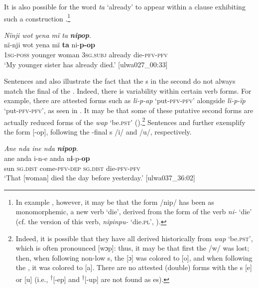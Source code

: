 It is also possible for the word \textit{ta} ‘already’ to appear within a clause exhibiting such a construction .\footnote{In example , however, it may be that the form /nip/ has been  as monomorphemic, a new verb ‘die’, derived from the  form of the verb \textit{ni-} ‘die’ (cf. the  version of this verb, \textit{nipinpu-} ‘die.\textsc{pl}’, ).}

\ea%
    \label{ex:verbs:47}
          \textit{Nïnji wot yena mï ta} \textbf{\textit{nipop}}.\\
\gll nï-nji    wot      yena    mï      \textbf{ta} ni-\textbf{p-op}\\
    \textsc{1sg-poss}  younger  woman    \textsc{3sg.subj}  already    die-\textsc{pfv-pfv}\\
\glt `My younger sister has already died.’ [ulwa027\_00:33]
\z

  Sentences  and  also illustrate the fact that the s in the second   do not always match the final  of the . Indeed, there is variability within certain verb forms. For example, there are attested forms such as \textit{lï-p-ap} ‘put-\textsc{pfv-pfv}’ alongside \textit{lï-p-ïp} ‘put-\textsc{pfv-pfv}’, as seen in . It may be that some of these putative second  forms are actually reduced forms of the   \textit{wap} ‘be.\textsc{pst}’ ().\footnote{Indeed, it is possible that they have all derived historically from \textit{wap} ‘be.\textsc{pst}’, which is often pronounced [wɔp]: thus, it may be that first the /w/ was lost; then, when following non-low s, the  [ɔ] was colored to [o], and when following the , it was colored to [a]. There are no attested (double)  forms with the s [e] or [u] (i.e., \textsuperscript{†}[-ep] and \textsuperscript{†}[-up] are not found as  es).} Sentences  and  further exemplify the form [-op], following the -final s /i/ and /u/, respectively.

\ea%
    \label{ex:verbs:48}
          \textit{Ane nda ine nda} \textbf{\textit{nipop}}.\\
\gll ane  anda    i-n-e      anda    n\textbf{i}{}-p-\textbf{op}\\
    sun  \textsc{sg.dist}  come-\textsc{pfv-dep}  \textsc{sg.dist}  die-\textsc{pfv-pfv}\\
\glt `That [woman] died the day before yesterday.’ [ulwa037\_36:02]
\z

